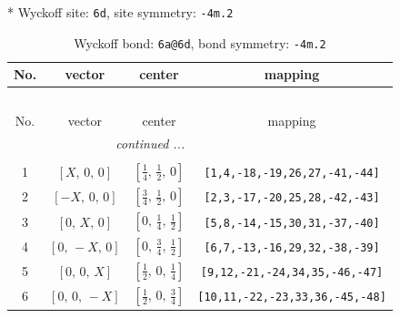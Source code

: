 \documentclass[fleqn,8pt]{jsarticle}
\begin{document}
* Wyckoff site: {\tt 6d}, site symmetry: {\tt -4m.2}
\renewcommand{\arraystretch}{1.2}
\begin{longtable}{cccc}
\caption{Wyckoff bond: {\tt 6a@6d}, bond symmetry: {\tt -4m.2}}
 \\
 \hline \hline
No. & vector & center & mapping \\ \hline \endfirsthead

\multicolumn{3}{l}{\tablename\ \thetable{}} \\
 \hline \hline
No. & vector & center & mapping \\ \hline \endhead

 \hline \hline
\multicolumn{3}{r}{\footnotesize\it continued ...} \\ \endfoot

 \hline \hline
\multicolumn{3}{r}{} \\ \endlastfoot

1 & $\left[ X,\, 0,\, 0 \right]$ & $\left[ \frac{1}{4},\, \frac{1}{2},\, 0 \right]$ & {\tt [1,4,-18,-19,26,27,-41,-44]} \\ \hline
2 & $\left[ - X,\, 0,\, 0 \right]$ & $\left[ \frac{3}{4},\, \frac{1}{2},\, 0 \right]$ & {\tt [2,3,-17,-20,25,28,-42,-43]} \\ \hline
3 & $\left[ 0,\, X,\, 0 \right]$ & $\left[ 0,\, \frac{1}{4},\, \frac{1}{2} \right]$ & {\tt [5,8,-14,-15,30,31,-37,-40]} \\ \hline
4 & $\left[ 0,\, - X,\, 0 \right]$ & $\left[ 0,\, \frac{3}{4},\, \frac{1}{2} \right]$ & {\tt [6,7,-13,-16,29,32,-38,-39]} \\ \hline
5 & $\left[ 0,\, 0,\, X \right]$ & $\left[ \frac{1}{2},\, 0,\, \frac{1}{4} \right]$ & {\tt [9,12,-21,-24,34,35,-46,-47]} \\ \hline
6 & $\left[ 0,\, 0,\, - X \right]$ & $\left[ \frac{1}{2},\, 0,\, \frac{3}{4} \right]$ & {\tt [10,11,-22,-23,33,36,-45,-48]} \\
\end{longtable}
\renewcommand{\arraystretch}{1.2}
\end{document}
